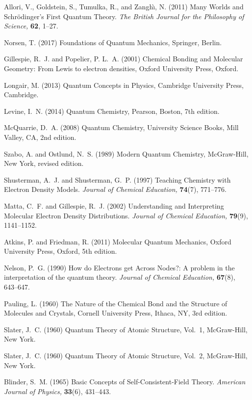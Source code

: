 \documentclass[onecolumn,secnumarabic,amsmath,amssymb,balancelastpage,nofootinbib]{article}
\begin{document}
\begin{thebibliography}{100}
Allori, V., Goldstein, S., Tumulka, R., and Zangh\`{\i}, N. (2011)
Many Worlds and Schr{\"o}dinger's First Quantum Theory.
{\em The British Journal for the Philosophy of Science,} {\bf 62}, 1--27.

Norsen, T. (2017)
Foundations of Quantum Mechanics,
Springer, Berlin.

Gillespie, R.~J. and Popelier, P. L.~A. (2001)
Chemical Bonding and Molecular Geometry: From Lewis to electron densities,
Oxford University Press, Oxford.

Longair, M. (2013)
Quantum Concepts in Physics,
Cambridge University Press, Cambridge.

Levine, I.~N. (2014)
Quantum Chemistry,
Pearson, Boston, 7th edition.

McQuarrie, D.~A. (2008)
Quantum Chemistry,
University Science Books, Mill Valley, CA, 2nd edition.

Szabo, A. and Ostlund, N.~S. (1989)
Modern Quantum Chemistry,
McGraw-Hill, New York, revised edition.

Shusterman, A.~J. and Shusterman, G.~P. (1997)
Teaching Chemistry with Electron Density Models.
{\em Journal of Chemical Education,} {\bf 74}(7), 771--776.

Matta, C.~F. and Gillespie, R.~J. (2002)
Understanding and Interpreting Molecular Electron Density Distributions.
{\em Journal of Chemical Education,} {\bf 79}(9), 1141--1152.

Atkins, P. and Friedman, R. (2011)
Molecular Quantum Mechanics,
Oxford University Press, Oxford, 5th edition.

Nelson, P.~G. (1990)
How do Electrons get Across Nodes?: A problem in the interpretation of the
  quantum theory.
{\em Journal of Chemical Education,} {\bf 67}(8), 643--647.

Pauling, L. (1960)
The Nature of the Chemical Bond and the Structure of Molecules and Crystals,
Cornell University Press, Ithaca, NY, 3rd edition.

Slater, J.~C. (1960)
Quantum Theory of Atomic Structure, Vol.~1,
McGraw-Hill, New York.

Slater, J.~C. (1960)
Quantum Theory of Atomic Structure, Vol.~2,
McGraw-Hill, New York.

Blinder, S.~M. (1965)
Basic Concepts of Self-Consistent-Field Theory.
{\em American Journal of Physics,} {\bf 33}(6), 431--443.


\end{thebibliography}
\end{document}
